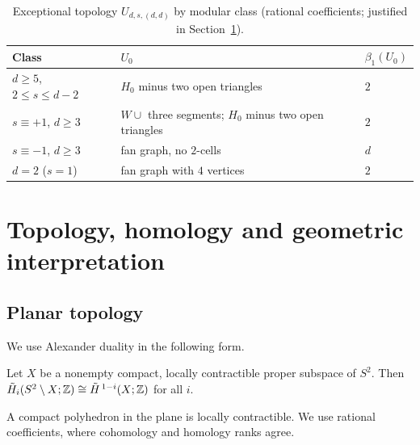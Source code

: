 \begin{table}[ht]
\centering\small
\begin{tabular}{@{}lll@{}}
\toprule
Class & $U_0$ & $\beta_1(U_0)$\\
\midrule
$d\ge5$, $2\le s\le d-2$ & $H_0$ minus two open triangles & $2$\\
$s\equiv+1$, $d\ge3$ & $W\cup$ three segments; $H_0$ minus two open triangles & $2$\\
$s\equiv-1$, $d\ge3$ & fan graph, no $2$-cells & $d$\\
$d=2$ ($s=1$) & fan graph with $4$ vertices & $2$\\
\bottomrule
\end{tabular}
\caption{Exceptional topology $U_{d,s,(d,d)}$ by modular class (rational coefficients; justified in Section~\ref{sec:topology}).}\label{tab:betti}
\end{table}

\section{Topology, homology and geometric interpretation}\label{sec:topology}

\subsection{Planar topology}

We use Alexander duality in the following form.

\begin{theorem}\label{thm:alexander}
Let $X$ be a nonempty compact, locally contractible proper subspace of $S^2$. Then $\tilde H_i(S^2\setminus X;\mathbb Z)\cong\tilde H^{\,1-i}(X;\mathbb Z)$ for all $i$.
\end{theorem}

A compact polyhedron in the plane is locally contractible. We use rational coefficients, where cohomology and homology ranks agree.

